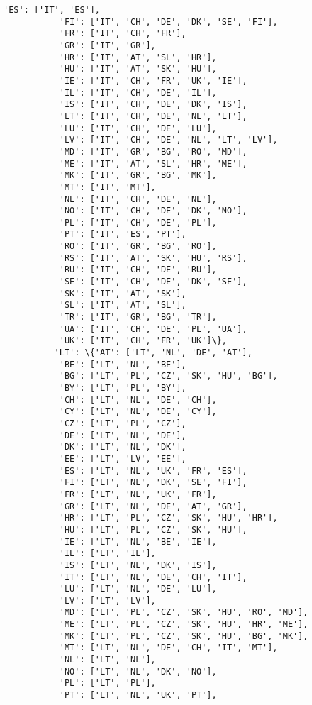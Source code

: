 \documentclass[11pt]{article}
\begin{document}
\begin{Verbatim}[commandchars=\\\{\}]
           'ES': ['IT', 'ES'],
           'FI': ['IT', 'CH', 'DE', 'DK', 'SE', 'FI'],
           'FR': ['IT', 'CH', 'FR'],
           'GR': ['IT', 'GR'],
           'HR': ['IT', 'AT', 'SL', 'HR'],
           'HU': ['IT', 'AT', 'SK', 'HU'],
           'IE': ['IT', 'CH', 'FR', 'UK', 'IE'],
           'IL': ['IT', 'CH', 'DE', 'IL'],
           'IS': ['IT', 'CH', 'DE', 'DK', 'IS'],
           'LT': ['IT', 'CH', 'DE', 'NL', 'LT'],
           'LU': ['IT', 'CH', 'DE', 'LU'],
           'LV': ['IT', 'CH', 'DE', 'NL', 'LT', 'LV'],
           'MD': ['IT', 'GR', 'BG', 'RO', 'MD'],
           'ME': ['IT', 'AT', 'SL', 'HR', 'ME'],
           'MK': ['IT', 'GR', 'BG', 'MK'],
           'MT': ['IT', 'MT'],
           'NL': ['IT', 'CH', 'DE', 'NL'],
           'NO': ['IT', 'CH', 'DE', 'DK', 'NO'],
           'PL': ['IT', 'CH', 'DE', 'PL'],
           'PT': ['IT', 'ES', 'PT'],
           'RO': ['IT', 'GR', 'BG', 'RO'],
           'RS': ['IT', 'AT', 'SK', 'HU', 'RS'],
           'RU': ['IT', 'CH', 'DE', 'RU'],
           'SE': ['IT', 'CH', 'DE', 'DK', 'SE'],
           'SK': ['IT', 'AT', 'SK'],
           'SL': ['IT', 'AT', 'SL'],
           'TR': ['IT', 'GR', 'BG', 'TR'],
           'UA': ['IT', 'CH', 'DE', 'PL', 'UA'],
           'UK': ['IT', 'CH', 'FR', 'UK']\},
          'LT': \{'AT': ['LT', 'NL', 'DE', 'AT'],
           'BE': ['LT', 'NL', 'BE'],
           'BG': ['LT', 'PL', 'CZ', 'SK', 'HU', 'BG'],
           'BY': ['LT', 'PL', 'BY'],
           'CH': ['LT', 'NL', 'DE', 'CH'],
           'CY': ['LT', 'NL', 'DE', 'CY'],
           'CZ': ['LT', 'PL', 'CZ'],
           'DE': ['LT', 'NL', 'DE'],
           'DK': ['LT', 'NL', 'DK'],
           'EE': ['LT', 'LV', 'EE'],
           'ES': ['LT', 'NL', 'UK', 'FR', 'ES'],
           'FI': ['LT', 'NL', 'DK', 'SE', 'FI'],
           'FR': ['LT', 'NL', 'UK', 'FR'],
           'GR': ['LT', 'NL', 'DE', 'AT', 'GR'],
           'HR': ['LT', 'PL', 'CZ', 'SK', 'HU', 'HR'],
           'HU': ['LT', 'PL', 'CZ', 'SK', 'HU'],
           'IE': ['LT', 'NL', 'BE', 'IE'],
           'IL': ['LT', 'IL'],
           'IS': ['LT', 'NL', 'DK', 'IS'],
           'IT': ['LT', 'NL', 'DE', 'CH', 'IT'],
           'LU': ['LT', 'NL', 'DE', 'LU'],
           'LV': ['LT', 'LV'],
           'MD': ['LT', 'PL', 'CZ', 'SK', 'HU', 'RO', 'MD'],
           'ME': ['LT', 'PL', 'CZ', 'SK', 'HU', 'HR', 'ME'],
           'MK': ['LT', 'PL', 'CZ', 'SK', 'HU', 'BG', 'MK'],
           'MT': ['LT', 'NL', 'DE', 'CH', 'IT', 'MT'],
           'NL': ['LT', 'NL'],
           'NO': ['LT', 'NL', 'DK', 'NO'],
           'PL': ['LT', 'PL'],
           'PT': ['LT', 'NL', 'UK', 'PT'],

\end{Verbatim}
\end{document}
